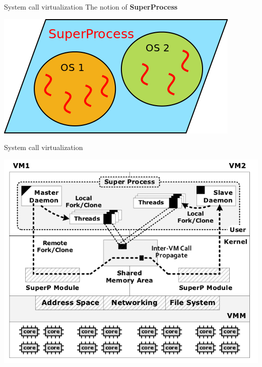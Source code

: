 \documentclass{beamer}
\begin{document}
\begin{frame}[t]{System call virtualization}
  The notion of \textbf{SuperProcess}
  \newline
  \begin{center}
    \includegraphics[scale=0.5]{SuperProcess.png}
  \end{center}
\end{frame}

\begin{frame}{System call virtualization}
  \begin{center}
    \includegraphics[scale=0.4]{adv_architecture.png}
  \end{center}
\end{frame}
\end{document}
